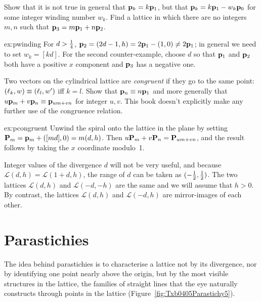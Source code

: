 \begin{jExercise}\label{ex:pwinding}
	Show that it is not true in general that ${\mathbf p}_{k}=k{\mathbf p}_{1}$, but that ${\mathbf p}_{k}=k{\mathbf p}_{1}-w_k{\mathbf p}_{0}$ for some integer winding number $w_k$. Find a lattice in which there are no integers $m,n$ such that ${\mathbf p}_{3}=m{\mathbf p}_{1}+n{\mathbf p}_{2}$. 
\end{jExercise}
\begin{jAnswer}{ex:pwinding}
	For $d>\textstyle{\frac{1}{4}}$, ${\mathbf p}_{2}= (2d-1, h)=2{\mathbf p}_{1}-(1,0)\neq 2{\mathbf p}_{1}$;   in general we need to set $w_k= [ kd]$. For the second counter-example, choose $d$ so that ${\mathbf p}_{1}$ and ${\mathbf p}_{2}$ both have a positive $x$ component and ${\mathbf p}_{3}$ has a negative one.  
\end{jAnswer}		
\begin{jExercise}\label{ex:pcongruent}
		Two vectors on the cylindrical lattice are \textit{congruent} if they go to the same point: $(\ell_{{k}},w)\equiv(\ell_{{l}},w')$ iff $k=l$. 
	Show that ${\mathbf p}_{n}\equiv n{\mathbf p}_{1}$ and more generally that $u{\mathbf p}_{m}+v{\mathbf p}_{n}\equiv{\mathbf p}_{um+vn}$ for integer  $u, v$.
	This book doesn't explicitly make any further use of the congruence relation. 
	\label{ex:npm}
\end{jExercise}
\begin{jAnswer}{ex:pcongruent}
	Unwind the spiral onto the lattice in the plane by setting ${\mathbf P}_{m}={\mathbf p}_{m}+([md],0)=m(d,h)$. Then $u{\mathbf P}_{m}+v{\mathbf P}_{n}={\mathbf P}_{um+vn}$, and the result follows by taking the $x$ coordinate modulo~1. 
		\end{jAnswer}
	
	
	
	Integer values of the divergence $d$ will not be very useful, and because   $\mathcal{L}(d,h)= \mathcal{L}(1+d,h)$, the range of $d$ can be taken as $(-\textstyle{\frac{1}{2}},\textstyle{\frac{1}{2}})$. The two lattices $\mathcal{L}(d,h)$ and $\mathcal{L}(-d,-h)$ are the same and we will assume that $h>0$. By contrast, the  lattices $\mathcal{L}(d,h)$ and $\mathcal{L}(-d,h)$ are mirror-images of each other.
		
\section{Parastichies}
\label{sec:parastichies}
The idea behind parastichies is to characterise a lattice not by its divergence, nor by identifying one point nearly above the origin, but by the most visible structures in the lattice, the families of straight lines that the eye naturally constructs through points in the lattice (Figure~\ref{fig:Txb0405Parastichy5}).



